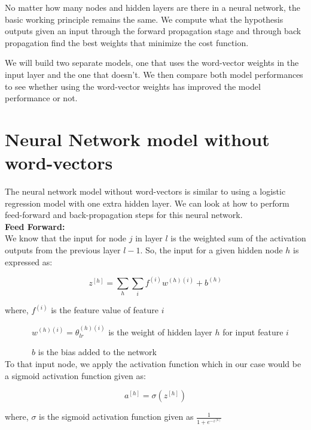 No matter how many nodes and hidden layers are there in a neural network, the basic working principle remains the same. We compute what the hypothesis outputs given an input through the forward propagation stage and through back propagation find the best weights that minimize the cost function.

We will build two separate models, one that uses the word-vector weights in the input layer and the one that doesn't. We then compare both model performances to see whether using the word-vector weights has improved the model performance or not.

\section{Neural Network model without word-vectors}

The neural network model without word-vectors is similar to using a logistic regression model with one extra hidden layer. We can look at how to perform feed-forward and back-propagation steps for this neural network.\\

\noindent \textbf{Feed Forward:}\\

We know that the input for node $j$ in layer $l$ is the weighted sum of the activation outputs from the previous layer $l-1$. So, the input for a given hidden node $h$ is expressed as:

\begin{equation}
z^{[h]} = \sum_{h}\sum_{i} f^{(i)}w^{(h)(i)} + b^{(h)}
\end{equation}

where, $f^{(i)}$ is the feature value of feature $i$

$\quad\qquad\ w^{(h)(i)} = \theta_{lr}^{(h)(i)}$ is the weight of hidden layer $h$ for input feature $i$

$\quad\qquad\ b$ is the bias added to the network\\

To that input node, we apply the activation function which in our case would be a sigmoid activation function given as:

\begin{equation}
a^{[h]} = \sigma(z^{[h]})
\end{equation}

where, $\sigma$ is the sigmoid activation function given as $\frac{1}{1+e^{-z^[h]}}$\\

